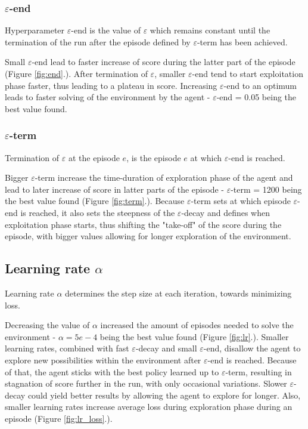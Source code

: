 \documentclass{article}
\begin{document}
\subsubsection*{$\varepsilon$-end}
Hyperparameter $\varepsilon$-end is the value of $\varepsilon$ which remains constant  until the termination of the run after the episode defined by $\varepsilon$-term has been achieved.

Small $\varepsilon$-end lead to faster increase of score during the latter part of the episode (Figure \ref{fig:end}.). After termination of $\varepsilon$, smaller $\varepsilon$-end tend to start exploitation phase faster, thus leading to a plateau in score. Increasing $\varepsilon$-end to an optimum leads to faster solving of the environment by the agent - $\varepsilon$-end = 0.05 being the best value found.

\subsubsection*{$\varepsilon$-term}
Termination of $\varepsilon$ at the episode $e$, is the episode $e$ at which $\varepsilon$-end is reached.

Bigger $\varepsilon$-term increase the time-duration of exploration phase of the agent and lead to later increase of score in latter parts of the episode - $\varepsilon$-term = 1200 being the best value found (Figure \ref{fig:term}.). Because $\varepsilon$-term sets at which episode $\varepsilon$-end is reached, it also sets the steepness of the $\varepsilon$-decay and defines when exploitation phase starts, thus shifting the "take-off" of the score during the episode, with bigger values allowing for longer exploration of the environment.

\subsection*{Learning rate $\alpha$}
Learning rate $\alpha$ determines the step size at each iteration, towards minimizing loss.

Decreasing the value of $\alpha$ increased the amount of episodes needed to solve the environment - $\alpha = 5e-4$ being the best value found (Figure \ref{fig:lr}.). Smaller learning rates, combined with fast $\varepsilon$-decay and small $\varepsilon$-end, disallow the agent to explore new possibilities within the environment after $\varepsilon$-end is reached. Because of that, the agent sticks with the best policy learned up to $\varepsilon$-term, resulting in stagnation of score further in the run, with only occasional variations. Slower $\varepsilon$-decay could yield better results by allowing the agent to explore for longer. Also, smaller learning rates increase average loss during exploration phase during an episode (Figure \ref{fig:lr_loss}.).
\end{document}
